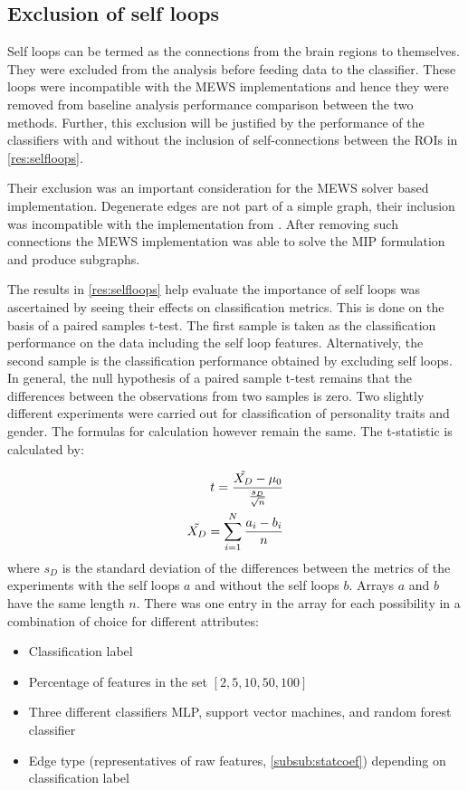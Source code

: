 \documentclass[msthesis.tex]{subfiles}
\begin{document}
\subsection{Exclusion of self loops}
\label{sec:exclusion}
Self loops can be termed as the connections from the brain regions to themselves. They were excluded from the analysis before feeding data to the classifier. These loops were incompatible with the MEWS implementations and hence they were removed from baseline analysis performance comparison between the two methods. Further, this exclusion will be justified by the performance of the classifiers with and without the inclusion of self-connections between the ROIs in \autoref{res:selfloops}. 

Their exclusion was an important consideration for the MEWS solver based implementation. Degenerate edges are not part of a simple graph, their inclusion was incompatible with the implementation from \cite{DBLP:journals/corr/LobodaAS16}. After removing such connections the MEWS implementation was able to solve the MIP formulation and produce subgraphs.

The results in \autoref{res:selfloops} help evaluate the importance of self loops was ascertained by seeing their effects on classification metrics. This is done on the basis of a paired samples t-test. The first sample is taken as the classification performance on the  data including the self loop features. Alternatively, the second sample is the classification performance obtained by excluding self loops. In general, the null hypothesis of a paired sample t-test remains that the differences between the observations from two samples is zero. Two slightly different experiments were carried out for classification of personality traits and gender. The formulas for calculation however remain the same. The t-statistic is calculated by:

\begin{align}
    \label{eq:pairedtest}
    t = \frac{\Tilde{X_{D}} - \mu_0}{\frac{s_{D}}{\sqrt{n}}} \\
    \Tilde{X_D} = \sum_{i=1}^{N} \frac{a_{i} - b_{i}}{n}
\end{align}where $s_D$ is the standard deviation of the differences between the metrics of the experiments with the self loops $a$ and without the self loops $b$. Arrays $a$ and $b$ have the same length $n$. There was one entry in the array for each possibility in a combination of choice for different attributes:
\begin{itemize}
    \item Classification label
    \item Percentage of features in the set $[2,5,10,50,100]$
    \item Three different classifiers MLP, support vector machines, and random forest classifier 
    \item Edge type (representatives of raw features, \autoref{subsub:statcoef}) depending on classification label
\end{itemize}
\end{document}
